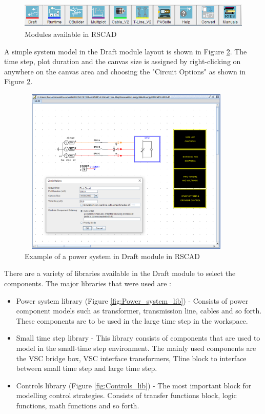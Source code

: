 \begin{figure}[H]
\centering
    \includegraphics[height = 1.2cm,width = 12.5cm]{Diagrams/Chapter_3/RSCAD_modules.PNG}
    \caption{Modules available in RSCAD}
    \label{fig:RSCAD_modules}
\end{figure}

A simple system model in the Draft module layout is shown in Figure \ref{fig:Dft_RSCAD}. The time step, plot duration and the canvas size is assigned by right-clicking on anywhere on the canvas area and choosing the "Circuit Options" as shown in Figure \ref{fig:Dft_RSCAD}.

\begin{figure}[H]
\centering
    \includegraphics[height = 8cm,width = 10.5cm]{Diagrams/Chapter_3/Dft_RSCAD.PNG}
    \caption{Example of a power system in Draft module in RSCAD}
    \label{fig:Dft_RSCAD}
\end{figure}

There are a variety of libraries available in the Draft module to select the components. The major libraries that were used are \cite{rtds_tech}:
\begin{itemize}\label{Library_RSCAD}
    \item Power system library (Figure \ref{fig:Power_system_lib}) - Consists of power component models such as transformer, transmission line, cables and so forth. These components are to be used in the large time step in the workspace. 
    \item Small time step library - This library consists of components that are used to model in the small-time step environment. The mainly used components are the VSC bridge box, VSC interface transformers, Tline block to interface between small time step and large time step.    
    \item Controls library (Figure \ref{fig:Controls_lib}) - The most important block for modelling control strategies. Consists of transfer functions block, logic functions, math functions and so forth.
\end{itemize}

